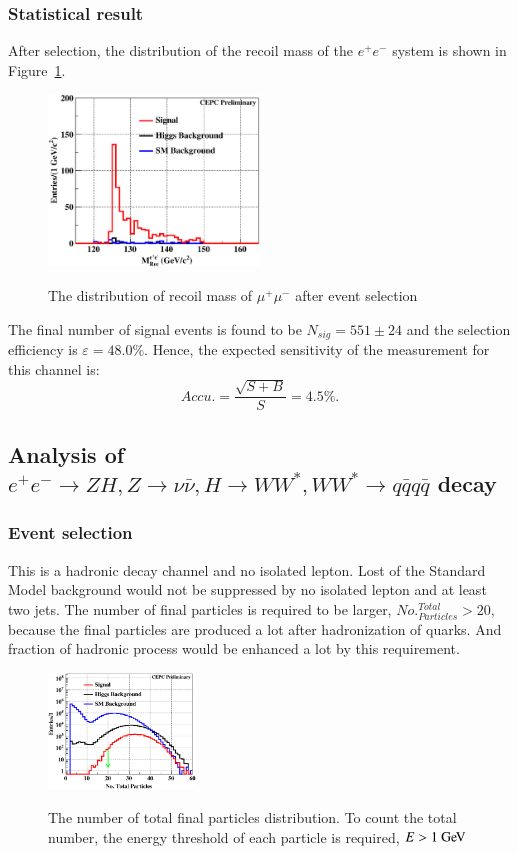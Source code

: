 \documentclass[11pt,a4paper]{cepcnote}
\begin{document}
\subsubsection{Statistical result}
After selection, the distribution of the recoil mass of the $e^+e^-$ system is shown in Figure~\ref{fig:eehuvqqrecfit}.
\begin{figure}[H]
\centering
\includegraphics[width=0.5\textwidth]{e1e1H/uvqq/fit_RecMass}
\label{fig:eehuvqqrecfit}
\caption[]{The distribution of recoil mass of $\mu^+\mu^-$ after event selection}
\end{figure}

The final number of signal events is found to be $N_{sig} = 551\pm24$
and the selection efficiency is $\varepsilon = 48.0\%$. 
Hence, the expected sensitivity of the measurement for this channel is:
\begin{equation*}
Accu.=\frac{\sqrt{S+B}}{S} = 4.5\%.
\end{equation*}

\subsection{Analysis of $e^+e^-\rightarrow ZH, Z\rightarrow \nu\bar{\nu}, H\rightarrow WW^*, WW^*\rightarrow q\bar{q}q\bar{q}$ decay}
\subsubsection{Event selection}
This is a hadronic decay channel and no isolated lepton. Lost of the Standard Model background would not be 
suppressed by no isolated lepton and at least two jets.
The number of final particles is required to be larger, $No._{Particles}^{Total} > 20$, because the final particles are 
produced a lot after hadronization of quarks. And fraction of hadronic process would be enhanced a lot by this requirement.
\begin{figure}[H]
	\centering
	\includegraphics[width= 0.35\textwidth]{nnH/fourq/TotPart}
	\label{fig:nnH4qTotPart}
	\caption[]{The number of total final particles distribution. To count the total number, the energy threshold of each particle 
	is required, $E > 1\gev$}
\end{figure}
\end{document}
